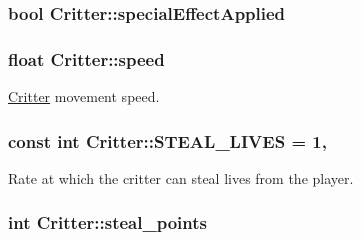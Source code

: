 \hypertarget{class_critter_aa30e57414bd64c920dca286f87da5c3f}{
\subsubsection[{special\+Effect\+Applied}]{\setlength{\rightskip}{0pt plus 5cm}bool Critter\+::special\+Effect\+Applied\hspace{0.3cm}{\ttfamily [protected]}}}\label{class_critter_aa30e57414bd64c920dca286f87da5c3f}
\hypertarget{class_critter_adde7d84a0dd9ac8f5dc144464928638f}{
\subsubsection[{speed}]{\setlength{\rightskip}{0pt plus 5cm}float Critter\+::speed\hspace{0.3cm}{\ttfamily [protected]}}}\label{class_critter_adde7d84a0dd9ac8f5dc144464928638f}


\hyperlink{class_critter}{Critter} movement speed. 

\hypertarget{class_critter_a1324eb838f1790e904a0b82c9ceed173}{
\subsubsection[{S\+T\+E\+A\+L\+\_\+\+L\+I\+V\+E\+S}]{\setlength{\rightskip}{0pt plus 5cm}const int Critter\+::\+S\+T\+E\+A\+L\+\_\+\+L\+I\+V\+E\+S = 1\hspace{0.3cm}{\ttfamily [static]}, {\ttfamily [protected]}}}\label{class_critter_a1324eb838f1790e904a0b82c9ceed173}


Rate at which the critter can steal lives from the player. 

\hypertarget{class_critter_ad2b5b3ee8a0b69d4023f60cfb9f26a6a}{
\subsubsection[{steal\+\_\+points}]{\setlength{\rightskip}{0pt plus 5cm}int Critter\+::steal\+\_\+points\hspace{0.3cm}{\ttfamily [protected]}}}\label{class_critter_ad2b5b3ee8a0b69d4023f60cfb9f26a6a}


